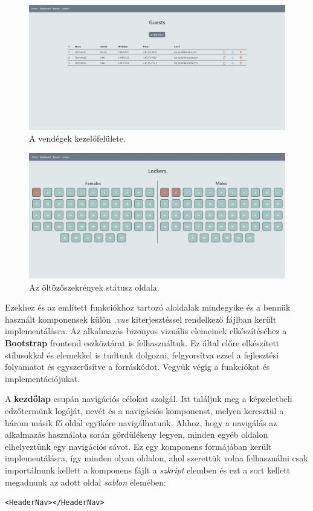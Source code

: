 \documentclass[12pt]{article}
\begin{document}
\begin{figure}[h!]
	\includegraphics[width=\textwidth]{guests-page}
	\caption{A vendégek kezelőfelülete. }
\end{figure}
\begin{figure}[h!]
	\includegraphics[width=\textwidth]{lockers-page}
	\caption{Az öltözőszekrények státusz oldala. }
\end{figure}

Ezekhez és az említett funkciókhoz tartozó aloldalak mindegyike és a bennük használt komponensek külön \textit{.vue} kiterjesztéssel rendelkező fájlban került implementálásra. Az alkalmazás bizonyos vizuális elemeinek elkészítéséhez a \textbf{Bootstrap} frontend eszköztárat is felhasználtuk. Ez által előre elkészített stílusokkal és elemekkel is tudtunk dolgozni, felgyorsítva ezzel a fejlesztési folyamatot és egyszerűsítve a forráskódot.
Vegyük végig a funkciókat és implementációjukat.

A \textbf{kezdőlap} csupán navigációs célokat szolgál. Itt találjuk meg a képzeletbeli edzőtermünk logóját, nevét és a navigációs komponenst, melyen keresztül a három másik fő oldal egyikére navigálhatunk. Ahhoz, hogy a navigálás az alkalmazás használata során gördülékeny legyen, minden egyéb oldalon elhelyeztünk egy navigációs sávot. Ez egy komponens formájában került implementálásra, így minden olyan oldalon, ahol szerettük volna felhasználni csak importálnunk kellett a komponens fájlt a \textit{szkript} elemben és ezt a sort kellett megadnunk az adott oldal \textit{sablon} elemében:
\begin{verbatim}
<HeaderNav></HeaderNav>
\end{verbatim}
\end{document}
